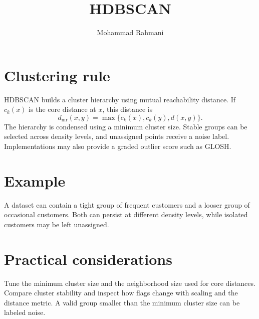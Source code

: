 \documentclass[a4paper]{article}
\title{HDBSCAN}
\date{}
\author{Mohammad Rahmani}
\begin{document}
   \maketitle

\section{Clustering rule}
HDBSCAN builds a cluster hierarchy using mutual reachability distance. If \(c_k(x)\) is the core distance at \(x\), this distance is
\[
d_{\mathrm{mr}}(x,y)=\max\{c_k(x),c_k(y),d(x,y)\}.
\]
The hierarchy is condensed using a minimum cluster size. Stable groups can be selected across density levels, and unassigned points receive a noise label. Implementations may also provide a graded outlier score such as GLOSH.

\section{Example}
A dataset can contain a tight group of frequent customers and a looser group of occasional customers. Both can persist at different density levels, while isolated customers may be left unassigned.

\section{Practical considerations}
Tune the minimum cluster size and the neighborhood size used for core distances. Compare cluster stability and inspect how flags change with scaling and the distance metric. A valid group smaller than the minimum cluster size can be labeled noise.



   
   
\end{document}
